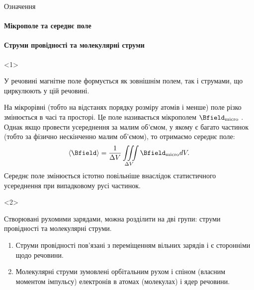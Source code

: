 \documentclass[onlytextwidth]{beamer}
\begin{document}
\begin{frame}{Означення}{}
	\framesubtitle<1>{Мікрополе та середнє поле}
	\framesubtitle<2>{Струми провідності та молекулярні струми}
	\begin{onlyenv}
		\begin{block}{}\justifying
			У речовині магнітне поле формується як зовнішнім полем, так і струмами, що циркулюють у цій речовині.

			\bigskip

			На мікрорівні (тобто на відстанях
			порядку розміру атомів і менше) поле різко змінюється в часі та просторі. Це поле називається \alert{мікрополем} $\Bfield_\text{micro}$ .
			Однак якщо провести усереднення за малим об'ємом, у якому є багато частинок (тобто за фізично нескінченно малим об'ємом), то отримаємо
			середнє поле:
			\begin{equation*}
				\left\langle \Bfield\right\rangle = \frac1{\Delta V} \iiint\limits_{\Delta V}
				\Bfield_\text{micro} dV.
			\end{equation*}
			\alert{Середнє поле} змінюється істотно повільніше внаслідок статистичного усереднення при випадковому русі частинок.
		\end{block}
	\end{onlyenv}
	\begin{onlyenv}
		\begin{block}{}\justifying
			Створювані рухомими зарядами, можна розділити на дві групи: \alert{струми провідності} та \alert{молекулярні струми}.
			\begin{enumerate}
				\item \alert{Струми провідності} пов'язані з переміщенням вільних зарядів і є сторонніми щодо речовини.
				\item \alert{Молекулярні струми} зумовлені орбітальним рухом і спіном (власним моментом імпульсу) електронів в атомах (молекулах) і ядер речовини.
			\end{enumerate}
		\end{block}
	\end{onlyenv}
\end{frame}
\end{document}
